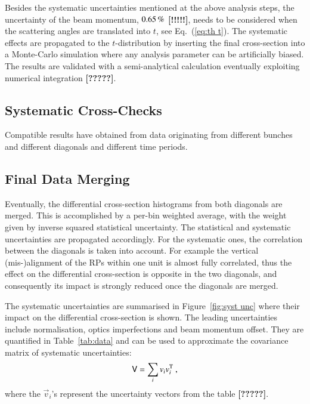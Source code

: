 Besides the systematic uncertainties mentioned at the above analysis steps, the uncertainty of the beam momentum, $0.65\,{\rm \%}$ \textbf{[!!!!!]}, needs to be considered when the scattering angles are translated into $t$, see Eq.~(\ref{eq:th t}). The systematic effects are propagated to the $t$-distribution by inserting the final cross-section into a Monte-Carlo simulation where any analysis parameter can be artificially biased. The results are validated with a semi-analytical calculation eventually exploiting numerical integration \textbf{[?????]}.




\subsection{Systematic Cross-Checks}
\label{sec:cross checks}

Compatible results have obtained from data originating from different bunches and different diagonals and different time periods.


\subsection{Final Data Merging}
\label{sec:final data merging}

Eventually, the differential cross-section histograms from both diagonals are merged. This is accomplished by a per-bin weighted average, with the weight given by inverse squared statistical uncertainty. The statistical and systematic uncertainties are propagated accordingly. For the systematic ones, the correlation between the diagonals is taken into account. For example the vertical (mis-)alignment of the RPs within one unit is almost fully correlated, thus the effect on the differential cross-section is opposite in the two diagonals, and consequently its impact is strongly reduced once the diagonals are merged.

The systematic uncertainties are summarised in Figure~\ref{fig:syst unc} where their impact on the differential cross-section is shown. The leading uncertainties include normalisation, optics imperfections and beam momentum offset. They are quantified in Table~\ref{tab:data} and can be used to approximate the covariance matrix of systematic uncertainties:
\begin{equation}
\label{eq:covar mat}
\mathsf{V} = \sum_{i} v_i v_i^{\rm T}\ ,
\end{equation}
where the $\vec v_i$'s represent the uncertainty vectors from the table \textbf{[?????]}.

